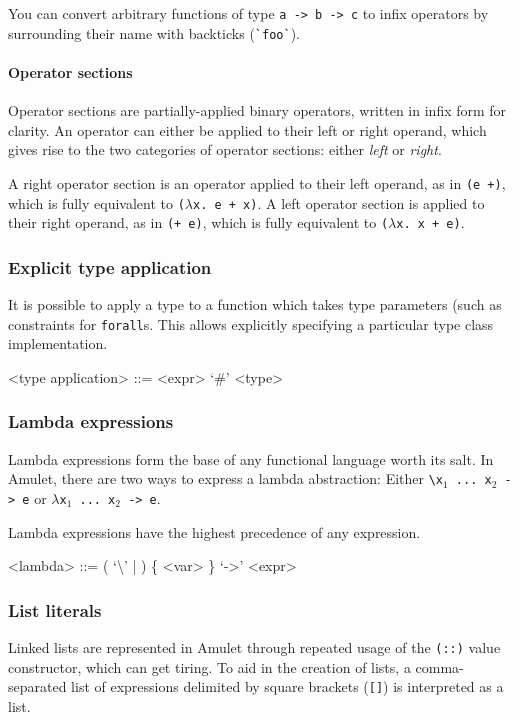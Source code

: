 You can convert arbitrary functions of type \texttt{a -> b -> c} to infix operators by surrounding their name with backticks (\texttt{\`{}foo\`{}}).

\paragraph{Operator sections}

Operator sections are partially-applied binary operators, written in infix form for clarity. An operator can either be applied to their left or right operand, which gives rise to the two categories of operator sections: either \textit{left} or \textit{right}.

A right operator section is an operator applied to their left operand, as in \texttt{(e +)}, which is fully equivalent to \texttt{($\lambda$x. e + x)}. A left operator section is applied to their right operand, as in \texttt{(+ e)}, which is fully equivalent to \texttt{($\lambda$x. x + e)}.

\subsubsection{Explicit type application}
It is possible to apply a type to a function which takes type parameters (such as constraints for \texttt{forall}s. This allows explicitly specifying a particular type class implementation.

\begin{grammar}
<type application> ::= <expr> `#' <type>
\end{grammar}

\subsubsection{Lambda expressions}

Lambda expressions form the base of any functional language worth its salt. In Amulet, there are two ways to express a lambda abstraction: Either \texttt{\textbackslash x$_1$ ... x$_2$ -> e} or \texttt{$\lambda$x$_1$ ... x$_2$ -> e}.

Lambda expressions have the highest precedence of any expression.

\begin{grammar}
<lambda> ::= ( `\textbackslash' | \lit{$\lambda$} ) \{ <var> \} `->' <expr>
\end{grammar}

\subsubsection{List literals}
Linked lists are represented in Amulet through repeated usage of the \texttt{(::)} value constructor, which can get tiring. To aid in the creation of lists, a comma-separated list of expressions delimited by square brackets (\texttt{[]}) is interpreted as a list.

